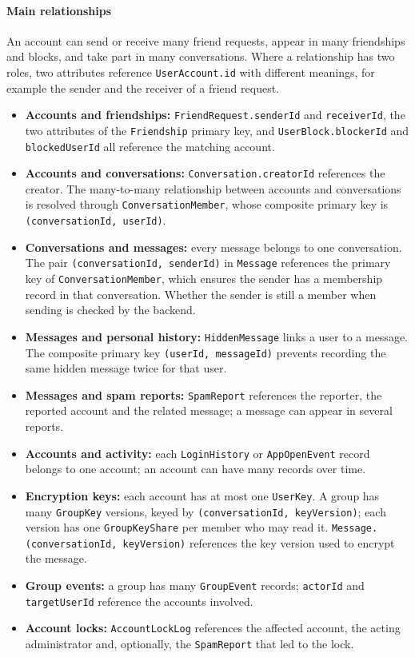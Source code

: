 \paragraph{Main relationships}
\mbox{}\par

An account can send or receive many friend requests, appear in many friendships
and blocks, and take part in many conversations. Where a relationship has two
roles, two attributes reference \texttt{UserAccount.id} with different meanings,
for example the sender and the receiver of a friend request.

\begin{itemize}
  \item \textbf{Accounts and friendships:}
    \texttt{FriendRequest.senderId} and \texttt{receiverId},
    the two attributes of the \texttt{Friendship} primary key,
    and \texttt{UserBlock.blockerId} and \texttt{blockedUserId}
    all reference the matching account.
  \item \textbf{Accounts and conversations:}
    \texttt{Conversation.creatorId} references the creator.
    The many-to-many relationship between accounts and conversations is
    resolved through \texttt{ConversationMember}, whose composite primary key is
    \texttt{(conversationId, userId)}.
  \item \textbf{Conversations and messages:}
    every message belongs to one conversation. The pair
    \texttt{(conversationId, senderId)} in \texttt{Message}
    references the primary key of \texttt{ConversationMember}, which ensures
    the sender has a membership record in that conversation.
    Whether the sender is still a member when sending is checked by the backend.
  \item \textbf{Messages and personal history:}
    \texttt{HiddenMessage} links a user to a message.
    The composite primary key \texttt{(userId, messageId)} prevents recording
    the same hidden message twice for that user.
  \item \textbf{Messages and spam reports:}
    \texttt{SpamReport} references the reporter, the reported account
    and the related message; a message can appear in several reports.
  \item \textbf{Accounts and activity:}
    each \texttt{LoginHistory} or \texttt{AppOpenEvent} record
    belongs to one account; an account can have many records over time.
  \item \textbf{Encryption keys:}
    each account has at most one \texttt{UserKey}. A group has many
    \texttt{GroupKey} versions, keyed by \texttt{(conversationId, keyVersion)};
    each version has one \texttt{GroupKeyShare} per member who may read it.
    \texttt{Message.(conversationId, keyVersion)} references the key version
    used to encrypt the message.
  \item \textbf{Group events:}
    a group has many \texttt{GroupEvent} records; \texttt{actorId} and
    \texttt{targetUserId} reference the accounts involved.
  \item \textbf{Account locks:}
    \texttt{AccountLockLog} references the affected account, the acting
    administrator and, optionally, the \texttt{SpamReport} that led to the lock.
\end{itemize}

